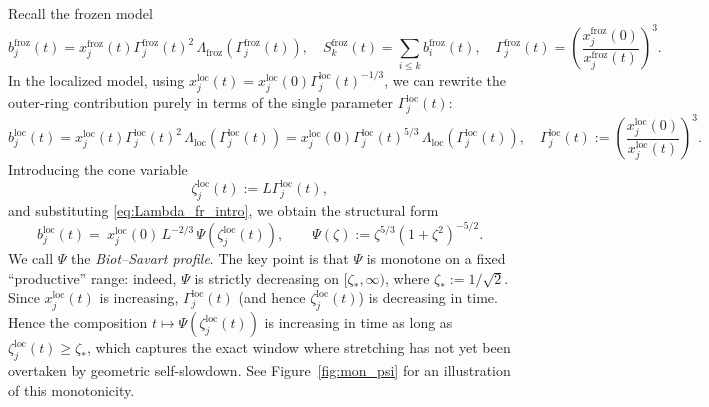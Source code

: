 \documentclass[reqno,11pt]{amsart}
\begin{document}
Recall the frozen model
\[
    b_j^{\mathrm{froz}}(t)=x_j^{\mathrm{froz}}(t)\Gamma_j^{\mathrm{froz}}(t)^2\,\Lambda_{\mathrm{froz}}(\Gamma_j^{\mathrm{froz}}(t)),
    \quad
    S_k^{\mathrm{froz}}(t)=\sum_{i\le k} b_i^{\mathrm{froz}}(t),
    \quad
    \Gamma_j^{\mathrm{froz}}(t)=\left(\frac{x_j^{\mathrm{froz}}(0)}{x_j^{\mathrm{froz}}(t)}\right)^3.
\]
In the localized model, using $x_j^{\mathrm{loc}}(t)=x_j^{\mathrm{loc}}(0)\Gamma_j^{\mathrm{loc}}(t)^{-1/3}$, we can rewrite the outer-ring
contribution purely in terms of the single parameter $\Gamma_j^{\mathrm{loc}}(t)$:
\[
    b_j^{\mathrm{loc}}(t)
    =
    x_j^{\mathrm{loc}}(t)\Gamma_j^{\mathrm{loc}}(t)^2\,\Lambda_{\mathrm{loc}}(\Gamma_j^{\mathrm{loc}}(t))
    =
    x_j^{\mathrm{loc}}(0)\Gamma_j^{\mathrm{loc}}(t)^{5/3}\,\Lambda_{\mathrm{loc}}(\Gamma_j^{\mathrm{loc}}(t)), 
    \quad
    \Gamma_j^{\mathrm{loc}} (t):=
    \left(\frac{x_j^{\mathrm{loc}}(0)}{x_j^{\mathrm{loc}}(t)}
    \right)^3.
\]
Introducing the cone variable
\[
    \zeta_j^{\mathrm{loc}}(t):=L\Gamma_j^{\mathrm{loc}}(t),
\]
and substituting \eqref{eq:Lambda_fr_intro}, we obtain the structural form
\begin{equation}\label{eq:bj_Psi_intro}
    b_j^{\mathrm{loc}}(t) = \ x_j^{\mathrm{loc}}(0)\,L^{-2/3}\,\Psi(\zeta_j^{\mathrm{loc}}(t)),
    \qquad
    \Psi(\zeta):=\zeta^{5/3}(1+\zeta^2)^{-5/2}.
\end{equation}
We call $\Psi$ the \emph{Biot--Savart profile}.
The key point is that \(\Psi\) is monotone on a fixed ``productive'' range:
indeed, $\Psi$ is strictly decreasing on $[\zeta_\ast,\infty)$, where $\zeta_\ast:=1/\sqrt2$.
Since $x_j^{\mathrm{loc}}(t)$ is increasing, $\Gamma_j^{\mathrm{loc}}(t)$ (and hence $\zeta_j^{\mathrm{loc}}(t)$) is decreasing in time. Hence the composition $t\mapsto\Psi(\zeta_j^{\mathrm{loc}}(t))$ is  increasing in time as long as $\zeta_j^{\mathrm{loc}}(t) \geq \zeta_*$, which captures the exact window where stretching has not yet been overtaken by geometric self-slowdown. See Figure~\ref{fig:mon_psi} for an illustration of this monotonicity.
\end{document}
